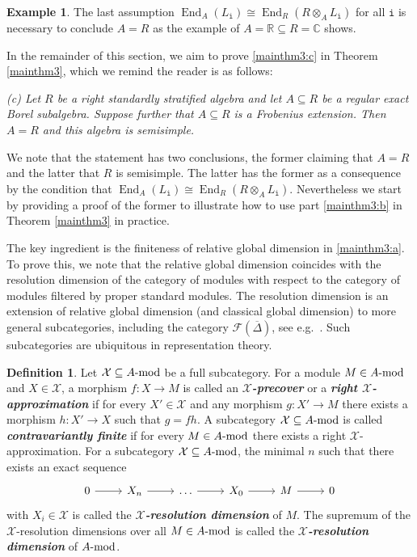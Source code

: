 \documentclass[12pt,a4paper]{amsart}
\theoremstyle{plain}
\theoremstyle{definition}
\newtheorem{defn}[thm]{Definition}
\newtheorem{ex}[thm]{Example}
\numberwithin{equation}{thm}
\newcommand{\emphbf}[1]{\emph{\textbf{#1}}}
\DeclareMathOperator{\End}{End}
\newcommand{\modu}[1]{#1\hbox{-}\mathrm{mod}}
\begin{document}
\begin{ex}
The last assumption $\End_A(L_\mathtt{i})\cong \End_R(R\otimes_A L_\mathtt{i})$ for all $\mathtt{i}$ is necessary to conclude $A=R$ as the example of $A=\mathbb{R}\subseteq R=\mathbb{C}$ shows. 
\end{ex}

In the remainder of this section, we aim to prove \eqref{mainthm3:c} in Theorem \ref{mainthm3}, which we remind the reader is as follows:

\medskip

\textit{
(c) Let $R$ be a right standardly stratified algebra and let $A\subseteq R$ be a regular exact Borel subalgebra. Suppose further that $A\subseteq R$ is a Frobenius extension. Then $A=R$ and this algebra is semisimple.}

\medskip
We note that the statement has two conclusions, the former claiming that $A=R$ and the latter that $R$ is semisimple. The latter has the former as a consequence by the condition that $\End_A(L_\mathtt{i})\cong \End_R(R\otimes_A L_{\mathtt{i}})$. Nevertheless we start by providing a proof of the former to illustrate how to use part \eqref{mainthm3:b} in Theorem \ref{mainthm3} in practice. 

The key ingredient is the finiteness of relative global dimension in \eqref{mainthm3:a}. To prove this, we note that the relative global dimension coincides with the resolution dimension of the category of modules with respect to the category of modules filtered by proper standard modules. The resolution dimension is an extension of relative global dimension (and classical global dimension) to more general subcategories, including the category $\mathcal{F}(\overline{\Delta})$, see e.g.\ \cite{Zhu13}. Such subcategories are ubiquitous in representation theory.

\begin{defn}
Let $\mathcal{X}\subseteq \modu{A}$ be a full subcategory. For a module $M\in \modu{A}$ and $X\in \mathcal{X}$, a morphism $f\colon X\to M$ is called an \emphbf{$\mathcal{X}$-precover} or a \emphbf{right $\mathcal{X}$-approximation} if for every $X'\in \mathcal{X}$ and any morphism $g\colon X'\to M$ there exists a morphism $h\colon X'\to X$ such that $g=fh$. A subcategory $\mathcal{X}\subseteq \modu{A}$ is called \emphbf{contravariantly finite} if for every $M\in \modu{A}$ there exists a right $\mathcal{X}$-approximation. For a subcategory $\mathcal{X}\subseteq \modu{A}$, the minimal $n$ such that there exists an exact sequence  
\[
\begin{tikzcd}
0\arrow{r} &X_n\arrow{r} &\dots\arrow{r} &X_0\arrow{r} &M\arrow{r} &0    
\end{tikzcd}\]
with $X_i\in \mathcal{X}$ is called the \emphbf{$\mathcal{X}$-resolution dimension} of $M$. The supremum of the $\mathcal{X}$-resolution dimensions over all $M\in \modu{A}$ is called the \emphbf{$\mathcal{X}$-resolution dimension} of $\modu{A}$.
\end{defn}
\end{document}

